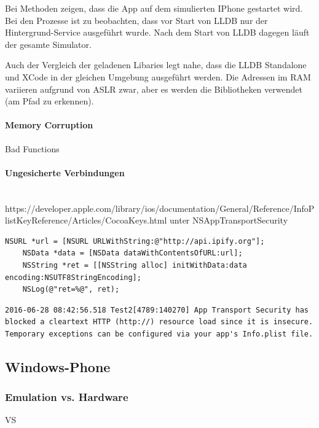 Bei Methoden zeigen, dass die App auf dem simulierten IPhone gestartet wird. Bei den Prozesse ist zu beobachten, dass vor Start von LLDB nur der Hintergrund-Service ausgeführt wurde. Nach dem Start von LLDB dagegen läuft der gesamte Simulator.

Auch der Vergleich der geladenen Libaries legt nahe, dass die LLDB Standalone und XCode in der gleichen Umgebung ausgeführt werden. Die Adressen im RAM variieren aufgrund von ASLR zwar, aber es werden die Bibliotheken verwendet (am Pfad zu erkennen).

\begin{figure}[htbp]

\label{fig:LLDB-creating-IPhone-VM}
\end{figure}

\paragraph{Memory Corruption}
Bad Functions


\paragraph{Ungesicherte Verbindungen}$ $\\
https://developer.apple.com/library/ios/documentation/General/Reference/InfoPlistKeyReference/Articles/CocoaKeys.html unter NSAppTransportSecurity

\begin{lstlisting}
NSURL *url = [NSURL URLWithString:@"http://api.ipify.org"];
    NSData *data = [NSData dataWithContentsOfURL:url];
    NSString *ret = [[NSString alloc] initWithData:data encoding:NSUTF8StringEncoding];
    NSLog(@"ret=%@", ret);
\end{lstlisting}

\begin{lstlisting}
2016-06-28 08:42:56.518 Test2[4789:140270] App Transport Security has blocked a cleartext HTTP (http://) resource load since it is insecure. Temporary exceptions can be configured via your app's Info.plist file.
\end{lstlisting}


		\subsection{Windows-Phone}
			\subsubsection{Emulation vs. Hardware}
			VS
